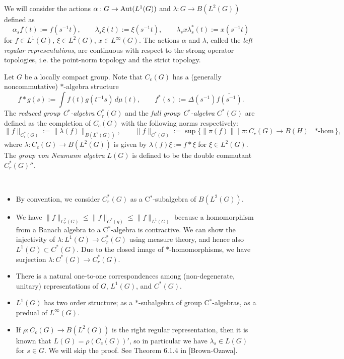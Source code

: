 \documentclass{../../small}
\begin{document}
\begin{defn}
We will consider the actions $\alpha:G\to\operatorname{Aut}(L^1(G))$ and $\lambda:G\to B(L^2(G))$ defined as
\[\alpha_sf(t):=f(s^{-1}t),\qquad \lambda_s\xi(t):=\xi(s^{-1}t),\qquad \lambda_sx\lambda_s^*(t):=x(s^{-1}t)\]
for $f\in L^1(G)$, $\xi\in L^2(G)$, $x\in L^\infty(G)$.
The actions $\alpha$ and $\lambda$, called the \emph{left regular representations}, are continuous with respect to the strong operator topologies, i.e. the point-norm topology and the strict topology.
\end{defn}

\begin{defn}
Let $G$ be a locally compact group.
Note that $C_c(G)$ has a (generally noncommutative) $*$-algebra structure
\[f*g(s):=\int f(t)g(t^{-1}s)\,d\mu(t),\qquad f^*(s):=\Delta(s^{-1})\bar{f(s^{-1})}.\]
The \emph{reduced group C$^*$-algebra} $C_r^*(G)$ and the \emph{full group C$^*$-algebra} $C^*(G)$ are defined as the completion of $C_c(G)$ with the following norms respectively:
\[\|f\|_{C_r^*(G)}:=\|\lambda(f)\|_{B(L^2(G))},\qquad\|f\|_{C^*(G)}:=\sup\{\|\pi(f)\|\mid\pi:C_c(G)\to B(H)\text{ $*$-hom}\},\]
where $\lambda:C_c(G)\to B(L^2(G))$ is given by $\lambda(f)\xi:=f*\xi$ for $\xi\in L^2(G)$.
The \emph{group von Neumann algebra} $L(G)$ is defined to be the double commutant $C_r^*(G)''$.
\end{defn}

\begin{rmk*}\,
\begin{itemize}
\item By convention, we consider $C_r^*(G)$ as a C$^*$-subalgebra of $B(L^2(G))$.
\item We have $\|f\|_{C_r^*(G)}\le\|f\|_{C^*(g)}\le\|f\|_{L^1(G)}$ because a homomorphism from a Banach algebra to a C$^*$-algebra is contractive. We can show the injectivity of $\lambda:L^1(G)\to C_r^*(G)$ using measure theory, and hence also $L^1(G)\subset C^*(G)$. Due to the closed image of $*$-homomorphisms, we have surjection $\lambda:C^*(G)\to C_r^*(G)$.
\item There is a natural one-to-one correspondences among (non-degenerate, unitary) representations of $G$, $L^1(G)$, and $C^*(G)$.
\item $L^1(G)$ has two order structure; as a $*$-subalgebra of group C$^*$-algebras, as a predual of $L^\infty(G)$.
\item If $\rho:C_c(G)\to B(L^2(G))$ is the right regular representation, then it is known that $L(G)=\rho(C_c(G))'$, so in particular we have $\lambda_s\in L(G)$ for $s\in G$. We will skip the proof. See Theorem 6.1.4 in [Brown-Ozawa].
\end{itemize}	
\end{rmk*}
\end{document}
